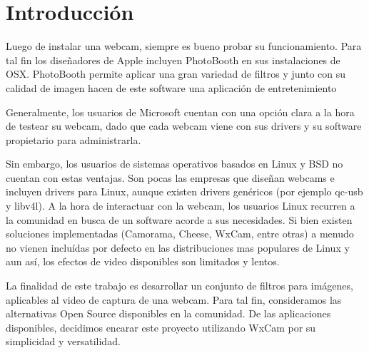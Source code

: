 \section{Introducción}

Luego de instalar una webcam, siempre es bueno probar su funcionamiento. Para tal fin los diseñadores de Apple incluyen PhotoBooth en sus instalaciones de OSX. PhotoBooth permite aplicar una gran variedad de filtros y junto con su calidad de imagen hacen de este software una aplicaci\'on de entretenimiento

Generalmente, los usuarios de Microsoft cuentan con una opci\'on clara a la hora de testear su webcam, dado que cada webcam viene con sus drivers y su software propietario para administrarla.

Sin embargo, los usuarios de sistemas operativos basados en Linux y BSD no cuentan con estas ventajas. Son pocas las empresas que diseñan webcams e incluyen drivers para Linux, aunque existen drivers gen\'ericos (por ejemplo qc-usb y libv4l). A la hora de interactuar con la webcam, los usuarios Linux recurren a la comunidad en busca de un software acorde a sus necesidades. Si bien existen soluciones implementadas (Camorama, Cheese, WxCam, entre otras) a menudo no vienen inclu\'idas por defecto en las distribuciones mas populares de Linux y aun as\'i, los efectos de video disponibles son limitados y lentos.

La finalidad de este trabajo es desarrollar un conjunto de filtros para im\'agenes, aplicables al video de captura de una webcam. Para tal fin, consideramos las alternativas Open Source disponibles en la comunidad. De las aplicaciones disponibles, decidimos encarar este proyecto utilizando WxCam por su simplicidad y versatilidad.

